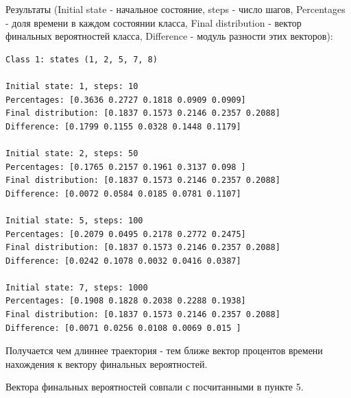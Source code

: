 \documentclass[12pt]{spbstu-task}
\begin{document}
Результаты (Initial state - начальное состояние, steps - число шагов,
Percentages - доля времени в каждом состоянии класса, Final distribution - вектор
финальных вероятностей класса, Difference - модуль разности этих векторов):

{\small
\begin{verbatim}
Class 1: states (1, 2, 5, 7, 8)

Initial state: 1, steps: 10
Percentages: [0.3636 0.2727 0.1818 0.0909 0.0909]
Final distribution: [0.1837 0.1573 0.2146 0.2357 0.2088]
Difference: [0.1799 0.1155 0.0328 0.1448 0.1179]

Initial state: 2, steps: 50
Percentages: [0.1765 0.2157 0.1961 0.3137 0.098 ]
Final distribution: [0.1837 0.1573 0.2146 0.2357 0.2088]
Difference: [0.0072 0.0584 0.0185 0.0781 0.1107]

Initial state: 5, steps: 100
Percentages: [0.2079 0.0495 0.2178 0.2772 0.2475]
Final distribution: [0.1837 0.1573 0.2146 0.2357 0.2088]
Difference: [0.0242 0.1078 0.0032 0.0416 0.0387]

Initial state: 7, steps: 1000
Percentages: [0.1908 0.1828 0.2038 0.2288 0.1938]
Final distribution: [0.1837 0.1573 0.2146 0.2357 0.2088]
Difference: [0.0071 0.0256 0.0108 0.0069 0.015 ]
\end{verbatim}
}

Получается чем длиннее траектория - тем ближе вектор процентов
времени нахождения к вектору финальных вероятностей.

Вектора финальных вероятностей
совпали с посчитанными в пункте 5.
\end{document}
